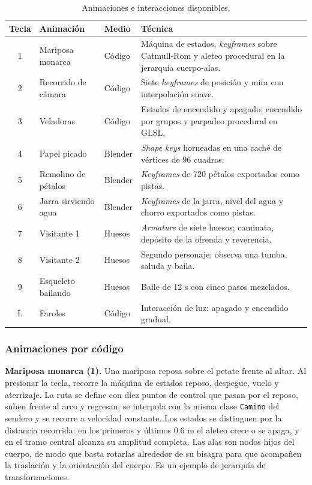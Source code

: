 \documentclass[letter,12pt]{article}
\begin{document}
	\begin{table}[H]
		\centering
		\small
		\begin{tabularx}{\textwidth}{c p{3.3cm} p{2.4cm} X}
			\toprule
			\textbf{Tecla} & \textbf{Animación} & \textbf{Medio} & \textbf{Técnica}\\
			\midrule
			1 & Mariposa monarca & Código & Máquina de estados, \textit{keyframes} sobre Catmull-Rom y aleteo procedural en la jerarquía cuerpo-alas. \\
			2 & Recorrido de cámara & Código & Siete \textit{keyframes} de posición y mira con interpolación suave. \\
			3 & Veladoras & Código & Estados de encendido y apagado; encendido por grupos y parpadeo procedural en GLSL. \\
			4 & Papel picado & Blender & \textit{Shape keys} horneadas en una caché de vértices de 96 cuadros. \\
			5 & Remolino de pétalos & Blender & \textit{Keyframes} de 720 pétalos exportados como pistas. \\
			6 & Jarra sirviendo agua & Blender & \textit{Keyframes} de la jarra, nivel del agua y chorro exportados como pistas. \\
			7 & Visitante 1 & Huesos & \textit{Armature} de siete huesos; caminata, depósito de la ofrenda y reverencia. \\
			8 & Visitante 2 & Huesos & Segundo personaje; observa una tumba, saluda y baila. \\
			9 & Esqueleto bailando & Huesos & Baile de 12 s con cinco pasos mezclados. \\
			L & Faroles & Código & Interacción de luz: apagado y encendido gradual. \\
			\bottomrule
		\end{tabularx}
		\caption{Animaciones e interacciones disponibles.}
		\label{tab:animaciones}
	\end{table}

	\subsubsection{Animaciones por código}
	\textbf{Mariposa monarca (1).} Una mariposa reposa sobre el petate frente al altar. Al presionar la tecla, recorre la máquina de estados reposo, despegue, vuelo y aterrizaje. La ruta se define con diez puntos de control que pasan por el reposo, suben frente al arco y regresan; se interpola con la misma clase \texttt{Camino} del sendero y se recorre a velocidad constante. Los estados se distinguen por la distancia recorrida: en los primeros y últimos 0.6 m el aleteo crece o se apaga, y en el tramo central alcanza su amplitud completa. Las alas son nodos hijos del cuerpo, de modo que basta rotarlas alrededor de su bisagra para que acompañen la traslación y la orientación del cuerpo. Es un ejemplo de jerarquía de transformaciones.
\end{document}
